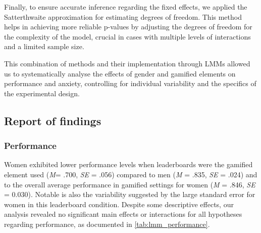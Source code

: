 Finally, to ensure accurate inference regarding the fixed effects, we applied the Satterthwaite approximation for estimating degrees of freedom.
This method helps in achieving more reliable p-values by adjusting the degrees of freedom for the complexity of the model, crucial in cases with multiple levels of interactions and a limited sample size.

This combination of methods and their implementation through LMMs allowed us to systematically analyse the effects of gender and gamified elements on performance and anxiety, controlling for individual variability and the specifics of the experimental design.

\subsection{Report of findings}

\subsubsection{Performance}
Women exhibited lower performance levels when leaderboards were the gamified element used (\textit{M}= .700, \textit{SE} = .056) compared to men (\textit{M} = .835, \textit{SE} = .024) and to the overall average performance in gamified settings for women (\textit{M} = .846, \textit{SE} = 0.030).
Notable is also the variability suggested by the large standard error for women in this leaderboard condition.
Despite some descriptive effects, our analysis revealed no significant main effects or interactions for all hypotheses regarding performance, as documented in \autoref{tab:lmm_performance}.

